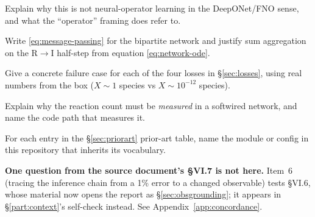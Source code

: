 \begin{selfcheck}
\item Explain why this is not neural-operator learning in the DeepONet/FNO
      sense, and what the ``operator'' framing does refer to.
\item Write \eqref{eq:message-passing} for the bipartite network and justify sum
      aggregation on the R$\to$I half-step from equation
      \eqref{eq:network-ode}.
\item Give a concrete failure case for each of the four losses in
      \S\ref{sec:losses}, using real numbers from the box ($X \sim 1$ species vs
      $X \sim 10^{-12}$ species).
\item Explain why the reaction count must be \emph{measured} in a softwired
      network, and name the code path that measures it.
\item For each entry in the \S\ref{sec:priorart} prior-art table, name the module
      or config in this repository that inherits its vocabulary.
\end{selfcheck}

\begin{aside}
\textbf{One question from the source document's \S VI.7 is not here.} Item~6
(tracing the inference chain from a 1\% \Ye{} error to a changed observable)
tests \S VI.6, whose material now opens the report as
\S\ref{sec:obsgrounding}; it appears in \S\ref{part:context}'s self-check
instead. See Appendix~\ref{app:concordance}.
\end{aside}
